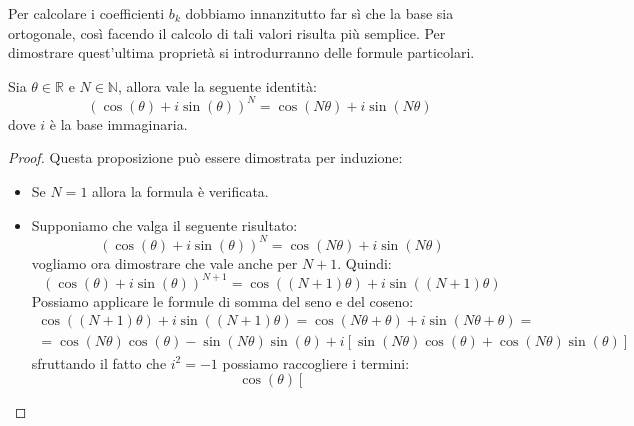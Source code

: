 Per calcolare i coefficienti $b_k$ dobbiamo innanzitutto far sì che la base sia
ortogonale, così facendo il calcolo di tali valori risulta più semplice. Per dimostrare
quest'ultima proprietà si introdurranno delle formule particolari.

\begin{proposizione}
    Sia $\theta\in \mathbb{R}$ e $N\in \mathbb{N}$, allora vale la seguente identità:
    \begin{equation}
        (\cos (\theta) + i\sin (\theta))^N = \cos(N \theta) + i \sin(N\theta)
    \end{equation}
    dove $i$ è la base immaginaria.
    \begin{proof}
        Questa proposizione può essere dimostrata per induzione:
        \begin{itemize}
            \item Se $N = 1$ allora la formula è verificata.
            \item Supponiamo che valga il seguente risultato:
                  \begin{equation*}
                      (\cos (\theta) + i\sin (\theta))^N = \cos(N \theta) + i \sin(N\theta)
                  \end{equation*}
                  vogliamo ora dimostrare che vale anche per $N+1$. Quindi:
                  \begin{equation*}
                      (\cos (\theta) + i\sin (\theta))^{N+1}= \cos((N+1) \theta) + i \sin((N+1)\theta)
                  \end{equation*}
                  Possiamo applicare le formule di somma del seno e del coseno:
                  \begin{equation*}
                      \begin{array}{l}
                          \cos((N + 1) \theta) + i \sin((N + 1)\theta) = \cos(N\theta
                          + \theta) + i \sin(N\theta + \theta) = \\
                          = \cos(N\theta)\cos(\theta) -\sin(N\theta)\sin(\theta) + i
                          \left[\sin(N\theta)\cos(\theta)+\cos(N\theta)\sin(\theta)\right]
                      \end{array}
                  \end{equation*}
                  sfruttando il fatto che $i^2 = -1$ possiamo raccogliere i termini:
                  \begin{equation*}
                      \cos(\theta) \left[

\end{equation*}
\end{itemize}
\end{proof}
\end{proposizione}
